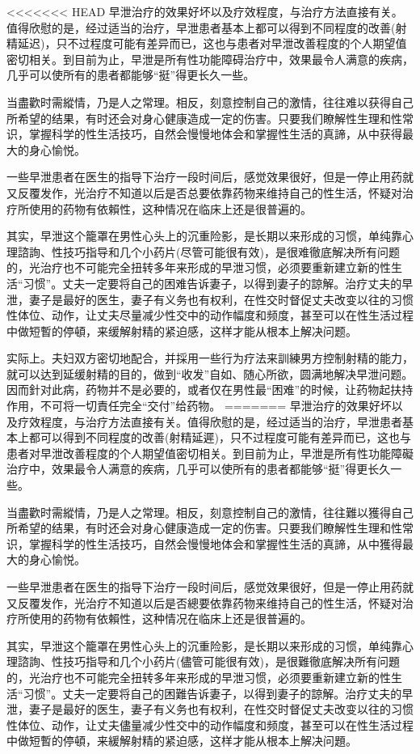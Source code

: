 \documentclass[12pt,UTF8]{ctexbook}
\begin{document}
<<<<<<< HEAD
早泄治疗的效果好坏以及疗效程度，与治疗方法直接有关。值得欣慰的是，经过适当的治疗，早泄患者基本上都可以得到不同程度的改善(射精延迟)，只不过程度可能有差异而已，这也与患者对早泄改善程度的个人期望值密切相关。到目前为止，早泄是所有性功能障碍治疗中，效果最令人满意的疾病，几乎可以使所有的患者都能够“挺”得更长久一些。

当盡歡时需縱情，乃是人之常理。相反，刻意控制自己的激情，往往难以获得自己所希望的结果，有时还会对身心健康造成一定的伤害。只要我们瞭解性生理和性常识，掌握科学的性生活技巧，自然会慢慢地体会和掌握性生活的真諦，从中获得最大的身心愉悦。

一些早泄患者在医生的指导下治疗一段时间后，感觉效果很好，但是一停止用药就又反覆发作，光治疗不知道以后是否总要依靠药物来维持自己的性生活，怀疑对治疗所使用的药物有依賴性，这种情况在临床上还是很普遍的。

其实，早泄这个籠罩在男性心头上的沉重险影，是长期以来形成的习惯，单纯靠心理諮詢、性技巧指导和几个小药片(尽管可能很有效)，是很难徹底解决所有问题的，光治疗也不可能完全扭转多年来形成的早泄习惯，必须要重新建立新的性生活“习惯”。丈夫一定要将自己的困难告诉妻子，以得到妻子的諒解。治疗丈夫的早泄，妻子是最好的医生，妻子有义务也有权利，在性交时督促丈夫改变以往的习惯性体位、动作，让丈夫尽量减少性交中的动作幅度和频度，甚至可以在性生活过程中做短暫的停頓，来缓解射精的紧迫感，这样才能从根本上解决问题。

实际上。夫妇双方密切地配合，并採用一些行为疗法来訓練男方控制射精的能力，就可以达到延缓射精的目的，做到“收发”自如、随心所欲，圆满地解决早泄问题。因而針对此病，药物并不是必要的，或者仅在男性最“困难”的时候，让药物起扶持作用，不可将一切責任完全“交付”给药物。
=======
早泄治疗的效果好坏以及疗效程度，与治疗方法直接有关。值得欣慰的是，经过适当的治疗，早泄患者基本上都可以得到不同程度的改善(射精延遲)，只不过程度可能有差异而已，这也与患者对早泄改善程度的个人期望值密切相关。到目前为止，早泄是所有性功能障礙治疗中，效果最令人满意的疾病，几乎可以使所有的患者都能够“挺”得更长久一些。

当盡歡时需縱情，乃是人之常理。相反，刻意控制自己的激情，往往難以獲得自己所希望的结果，有时还会对身心健康造成一定的伤害。只要我们瞭解性生理和性常识，掌握科学的性生活技巧，自然会慢慢地体会和掌握性生活的真諦，从中獲得最大的身心愉悦。

一些早泄患者在医生的指导下治疗一段时间后，感觉效果很好，但是一停止用药就又反覆发作，光治疗不知道以后是否總要依靠药物来维持自己的性生活，怀疑对治疗所使用的药物有依賴性，这种情况在临床上还是很普遍的。

其实，早泄这个籠罩在男性心头上的沉重险影，是长期以来形成的习惯，单纯靠心理諮詢、性技巧指导和几个小药片(儘管可能很有效)，是很難徹底解决所有问題的，光治疗也不可能完全扭转多年来形成的早泄习惯，必须要重新建立新的性生活“习惯”。丈夫一定要将自己的困難告诉妻子，以得到妻子的諒解。治疗丈夫的早泄，妻子是最好的医生，妻子有义务也有权利，在性交时督促丈夫改变以往的习惯性体位、动作，让丈夫儘量减少性交中的动作幅度和频度，甚至可以在性生活过程中做短暫的停頓，来緩解射精的紧迫感，这样才能从根本上解决问題。
\end{document}
